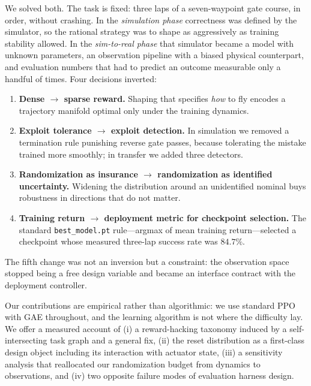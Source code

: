 \documentclass[10pt, twocolumn]{article}
\newcommand{\code}[1]{\texttt{\small #1}}
\begin{document}
We solved both. The task is fixed: three laps of a seven-waypoint gate course,
in order, without crashing. In the \emph{simulation phase} correctness was
defined by the simulator, so the rational strategy was to shape as aggressively
as training stability allowed. In the \emph{sim-to-real phase} that simulator
became a model with unknown parameters, an observation pipeline with a biased
physical counterpart, and evaluation numbers that had to predict an outcome
measurable only a handful of times. Four decisions inverted:

\begin{enumerate}[nosep, leftmargin=1.4em]
\item \textbf{Dense $\rightarrow$ sparse reward.} Shaping that specifies
\emph{how} to fly encodes a trajectory manifold optimal only under the training
dynamics.
\item \textbf{Exploit tolerance $\rightarrow$ exploit detection.} In simulation
we removed a termination rule punishing reverse gate passes, because tolerating
the mistake trained more smoothly; in transfer we added three detectors.
\item \textbf{Randomization as insurance $\rightarrow$ randomization as
identified uncertainty.} Widening the distribution around an unidentified
nominal buys robustness in directions that do not matter.
\item \textbf{Training return $\rightarrow$ deployment metric for checkpoint
selection.} The standard \code{best\_model.pt} rule---argmax of mean training
return---selected a checkpoint whose measured three-lap success rate was
$84.7\%$.
\end{enumerate}

The fifth change was not an inversion but a constraint: the observation space
stopped being a free design variable and became an interface contract with the
deployment controller.

Our contributions are empirical rather than algorithmic: we use standard PPO
\cite{schulman2017} with GAE \cite{schulman2016} throughout, and the learning
algorithm is not where the difficulty lay. We offer a measured account of (i) a
reward-hacking taxonomy induced by a self-intersecting task graph and a general
fix, (ii) the reset distribution as a first-class design object including its
interaction with actuator state, (iii) a sensitivity analysis that reallocated
our randomization budget from dynamics to observations, and (iv) two opposite
failure modes of evaluation harness design.
\end{document}
